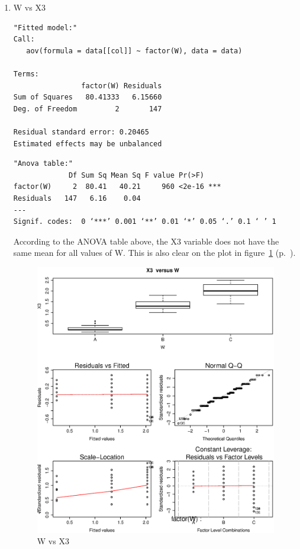 \documentclass{article}
\begin{document}
\begin{enumerate}
  \item W vs X3
  \begin{lstlisting}
"Fitted model:"
Call:
   aov(formula = data[[col]] ~ factor(W), data = data)

Terms:
                factor(W) Residuals
Sum of Squares   80.41333   6.15660
Deg. of Freedom         2       147

Residual standard error: 0.20465
Estimated effects may be unbalanced
  \end{lstlisting}
  
  \begin{lstlisting}
"Anova table:"
             Df Sum Sq Mean Sq F value Pr(>F)    
factor(W)     2  80.41   40.21     960 <2e-16 ***
Residuals   147   6.16    0.04                   
---
Signif. codes:  0 ‘***’ 0.001 ‘**’ 0.01 ‘*’ 0.05 ‘.’ 0.1 ‘ ’ 1
  \end{lstlisting}
  
  According to the ANOVA table above, the X3 variable does not have the same
  mean for all values of W. This is also clear on the plot in
  figure~\ref{fig:X3vsW} (p.~\pageref{fig:X3vsW}).
  
  \begin{figure}[H]
  \centering
  \includegraphics[scale=0.6]{X3vsW.eps}
  \caption{W vs X3}
  \label{fig:X3vsW}
  \end{figure}
\end{enumerate}
\end{document}
